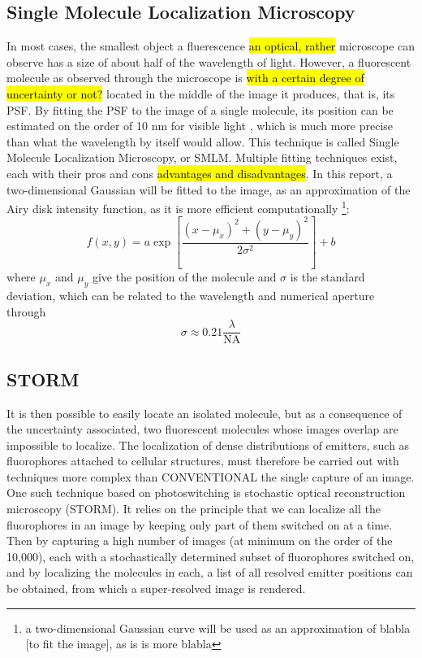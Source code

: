 \subsection{Single Molecule Localization Microscopy} \label{sec:SMLM}
In most cases, the smallest object a fluerescence \hl{an optical, rather} microscope can observe has a size of about half of the wavelength of light. However, a fluorescent molecule as observed through the microscope is \hl{with a certain degree of uncertainty or not?} located in the middle of the image it produces, that is, its PSF. By fitting the PSF to the image of a single molecule, its position can be estimated on the order of 10 nm for visible light \cite{douglass_notice_2023}, which is much more precise than what the wavelength by itself would allow. This technique is called Single Molecule Localization Microscopy, or SMLM. Multiple fitting techniques exist, each with their pros and cons \hl{advantages and disadvantages}. In this report, a two-dimensional Gaussian will be fitted to the image, as an approximation of the Airy disk intensity function, as it is more efficient \vbox{computationally \cite{douglass_notice_2023}\footnote{a two-dimensional Gaussian curve will be used as an approximation of blabla [to fit the image], as is is more blabla}:}
\begin{equation}
    f(x, y) = a \exp \left[ \frac{(x-\mu_x)^2 + (y-\mu_y)^2}{2 \sigma^2} \right] + b
\end{equation}
where $\mu_x$ and $\mu_y$ give the position of the molecule and $\sigma$ is the standard deviation, which can be related to the wavelength and numerical aperture through \cite{zhang-appliedoptics-2007}
\begin{equation}
    \sigma \approx 0.21 \frac{\lambda}{\textrm{NA}}
    \label{eq:PSF_width_gaussian}
\end{equation}


\subsection{STORM} \label{sec:STORM}
It is then possible to easily locate an isolated molecule, but as a consequence of the uncertainty associated, two fluorescent molecules whose images overlap are impossible to localize.
The localization of dense distributions of emitters, such as fluorophores attached to cellular structures, must therefore be carried out with techniques more complex than CONVENTIONAL the single capture of an image.
One such technique based on photoswitching is stochastic optical reconstruction microscopy (STORM).
It relies on the principle that we can localize all the fluorophores in an image by keeping only part of them switched on at a time.
Then by capturing a high number of images (at minimum on the order of the 10,000), each with a stochastically determined subset of fluorophores switched on, and by localizing the molecules in each, a list of all resolved emitter positions can be obtained, from which a super-resolved image is rendered.

